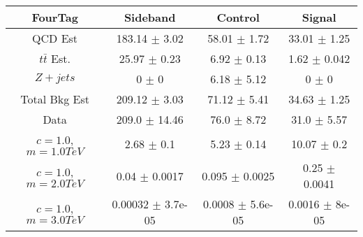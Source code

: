 \begin{footnotesize} 
\begin{tabular}{c|c|c|c} 
FourTag & Sideband & Control & Signal \\ 
\hline\hline 

QCD Est & 183.14 $\pm$ 3.02 & 58.01 $\pm$ 1.72 & 33.01 $\pm$ 1.25\\ 
$t\bar{t}$ Est.  & 25.97 $\pm$ 0.23 & 6.92 $\pm$ 0.13 & 1.62 $\pm$ 0.042\\ 
$Z+jets$ & 0 $\pm$ 0 & 6.18 $\pm$ 5.12 & 0 $\pm$ 0\\ 
Total Bkg Est & 209.12 $\pm$ 3.03 & 71.12 $\pm$ 5.41 & 34.63 $\pm$ 1.25\\ 
Data & 209.0 $\pm$ 14.46 & 76.0 $\pm$ 8.72 & 31.0 $\pm$ 5.57\\ 
$c=1.0$,$m=1.0TeV$ & 2.68 $\pm$ 0.1 & 5.23 $\pm$ 0.14 & 10.07 $\pm$ 0.2\\ 
$c=1.0$,$m=2.0TeV$ & 0.04 $\pm$ 0.0017 & 0.095 $\pm$ 0.0025 & 0.25 $\pm$ 0.0041\\ 
$c=1.0$,$m=3.0TeV$ & 0.00032 $\pm$ 3.7e-05 & 0.0008 $\pm$ 5.6e-05 & 0.0016 $\pm$ 8e-05\\ 

\hline\hline 
\end{tabular} 
\end{footnotesize} 
\newline 
